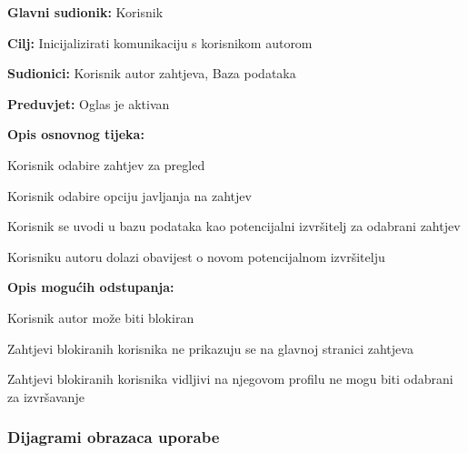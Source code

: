 			\noindent {}
			\begin{packed_item}
				
				\item \textbf{Glavni sudionik: }Korisnik
				\item  \textbf{Cilj:} Inicijalizirati komunikaciju s korisnikom autorom
				\item  \textbf{Sudionici:} Korisnik autor zahtjeva, Baza podataka
				\item  \textbf{Preduvjet:} Oglas je aktivan
				\item  \textbf{Opis osnovnog tijeka:}
				
				\item[] \begin{packed_enum}
					
					\item Korisnik odabire zahtjev za pregled
					\item Korisnik odabire opciju javljanja na zahtjev
					\item Korisnik se uvodi u bazu podataka kao potencijalni izvršitelj za odabrani zahtjev
					\item Korisniku autoru dolazi obavijest o novom potencijalnom izvršitelju
				\end{packed_enum}
				
				\item  \textbf{Opis mogućih odstupanja:}
				
				\item[] \begin{packed_item}
					
					\item[1.a] Korisnik autor može biti blokiran
					\item[] \begin{packed_enum}
						
						\item Zahtjevi blokiranih korisnika ne prikazuju se na glavnoj stranici zahtjeva
						\item Zahtjevi blokiranih korisnika vidljivi na njegovom profilu ne mogu biti odabrani za izvršavanje
						
					\end{packed_enum}
					
					
				\end{packed_item}
			\end{packed_item}
		
					
					
				\subsubsection{Dijagrami obrazaca uporabe}
					
